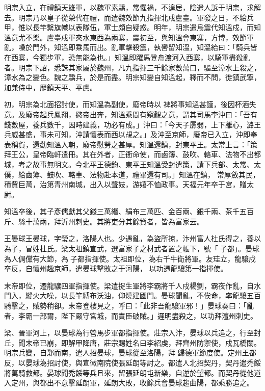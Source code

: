 \begin{pinyinscope}
 明宗入立，在禮鎮天雄軍，以魏軍素驕，常懼禍，不遑居，陰遣人訴于明宗，求解去。明宗乃以皇子從榮代在禮，而遣魏效節九指揮北戍盧臺。軍發之日，不給兵
 甲，惟以長竿繫旗幟以表隊伍，軍士頗自疑惑。明年，明宗遣烏震代知溫戍，而知溫意尤不樂。盧臺戍軍夾水東西為兩寨，震初至，與知溫會東寨，方博，效節軍亂，噪於門外，知溫即乘馬而出。亂軍擊殺震，執轡留知溫，知溫紿曰：「騎兵皆在西寨，今獨步軍，恐無能為也。」知溫即躍馬登舟渡河入西寨，以騎軍盡殺亂者。明宗下詔，悉誅其家屬於魏州，凡九指揮三千餘家數萬口，驅至漳水上殺之，漳水為之變色。魏之驕兵，於是而盡。明宗知變自知溫起，釋而不問，徙鎮武寧，加兼侍中，歷鎮天平、平盧。



 初，明宗為北面招討使，而知溫為副使，廢帝時以
 裨將事知溫甚謹，後因杯酒失意。及廢帝起兵鳳翔，愍帝出奔，知溫乘間有窺覦之意，謂其司馬李沖曰：「吾有錢數屋，養兵數千，因時建義，功必有成。」沖曰：「今天子孱弱，上下離心，潞王兵威甚盛，事未可知，沖請懷表而西以覘之。」及沖至京師，廢帝已入立，沖即奉表稱賀，還勸知溫入朝，廢帝慰勞之甚厚。知溫還鎮，封東平王。太常上言：「策拜王公，皇帝臨軒遣冊。其在外者，正衙命使，而鹵簿、鼓吹、輅車、法物不出都城，考之故事無明文。今北平王德鈞、東平王知溫受封遣策，請下兵部、太常、太僕，給鹵簿、鼓吹、輅車、法物赴本道，禮畢還有司。」知溫在鎮，
 常厚斂其民，積貲巨萬，治第青州南城，出入以聲妓，游嬉不恤政事。天福元年卒于宮，贈太尉。



 知溫卒後，其子彥儒獻其父錢三萬緡、絹布三萬匹、金百兩、銀千兩、茶千五百斤、絲十萬兩，拜沂州刺史。其將吏分其餘貲者，皆為富家云。



 王晏球王晏球，字瑩之，洛陽人也。少遇亂，為盜所掠，汴州富人杜氏得之，養以為子，冒姓杜氏。梁太祖鎮宣武，選富家子之材武者置之帳下，號「子都」。晏球為人倜儻有大節，為子都指揮使。太祖即位，為右千牛衛將軍。友珪立，龍驤戍卒反，自懷州趣京師，遣晏球擊敗之于河陽，
 以功遷龍驤第一指揮使。



 末帝即位，遷龍驤四軍指揮使。梁遣捉生軍將李霸將千人戍楊劉，霸夜作亂，自水門入，縱火大噪，以長竿縛布沃油，仰燒建國門。晏球聞亂，不俟命，率龍驤五百騎擊之，賊勢稍卻。末帝登樓見之，呼曰：「此非吾龍驤軍邪！」晏球奏曰：「亂者，李霸一部爾，陛下嚴守宮城，而責臣破賊。」遲明盡殺之，以功拜澶州刺史。



 梁、晉軍河上，以晏球為行營馬步軍都指揮使。莊宗入汴，晏球以兵追之，行至封丘，聞末帝已崩，即解甲降唐，莊宗賜姓名曰李紹虔，拜齊州防禦使，戍瓦橋關。明宗兵變，自鄴而南，遣人招晏球，晏球從至洛陽，拜
 歸德軍節度使。定州王都反，以晏球為招討使，與宣徽南院使張延朗等討之。都遣人北招契丹，契丹遣禿餒將萬騎救都。晏球聞禿餒等兵且來，留張延朗屯新樂，自逆於望都。而契丹從他道入定州，與都出不意擊延朗軍，延朗大敗，收餘兵會晏球趨曲陽，都乘勝追之。




\end{pinyinscope}
